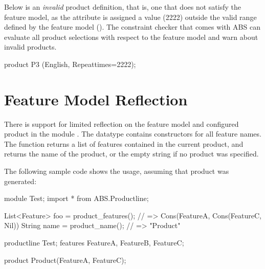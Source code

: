 Below is an \emph{invalid} product definition, that is, one that does not
satisfy the feature model, as the  attribute is assigned
a value (2222) outside the valid range defined by the feature model
(\absinline{[0..1000]}). The constraint checker that comes with ABS can evaluate
all product selections with respect to the feature model and warn about invalid
products.
\begin{abscode}
product P3 (English, Repeat{times=2222});
\end{abscode}

\section{Feature Model Reflection}
\label{sec:feat-model-refl}

There is support for limited reflection on the feature model and configured
product in the module .  The datatype
 contains constructors for all feature names.  The function
 returns a list of features contained in the
current product, and  returns the name of the product,
or the empty string if no product was specified.

The following sample code shows the usage, assuming that product
 was generated:
\begin{abscode}
module Test;
import * from ABS.Productline;

{
  List<Feature> foo = product_features(); // => Cons(FeatureA, Cons(FeatureC, Nil)) 
  String name = product_name();           // => "Product"
}

productline Test;
features FeatureA, FeatureB, FeatureC;

product Product(FeatureA, FeatureC);
\end{abscode}

